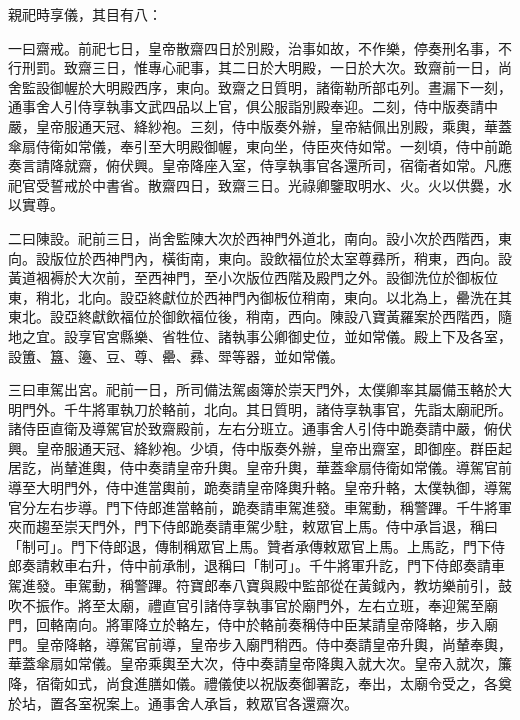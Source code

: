 \begin{pinyinscope}
 親祀時享儀，其目有八：



 一曰齋戒。前祀七日，皇帝散齋四日於別殿，治事如故，不作樂，停奏刑名事，不行刑罰。致齋三日，惟專心祀事，其二日於大明殿，一日於大次。致齋前一日，尚舍監設御幄於大明殿西序，東向。致齋之日質明，諸衛勒所部屯列。晝漏下一刻，通事舍人引侍享執事文武四品以上官，俱公服詣別殿奉迎。二刻，侍中版奏請中嚴，皇帝服通天冠、絳紗袍。三刻，侍中版奏外辦，皇帝結佩出別殿，乘輿，華蓋傘扇侍衛如常儀，奉引至大明殿御幄，東向坐，侍臣夾侍如常。一刻頃，侍中前跪奏言請降就齋，俯伏興。皇帝降座入室，侍享執事官各還所司，宿衛者如常。凡應祀官受誓戒於中書省。散齋四日，致齋三日。光祿卿鑒取明水、火。火以供爨，水以實尊。



 二曰陳設。祀前三日，尚舍監陳大次於西神門外道北，南向。設小次於西階西，東向。設版位於西神門內，橫街南，東向。設飲福位於太室尊彞所，稍東，西向。設黃道裀褥於大次前，至西神門，至小次版位西階及殿門之外。設御洗位於御板位東，稍北，北向。設亞終獻位於西神門內御板位稍南，東向。以北為上，罍洗在其東北。設亞終獻飲福位於御飲福位後，稍南，西向。陳設八寶黃羅案於西階西，隨地之宜。設享官宮縣樂、省牲位、諸執事公卿御史位，並如常儀。殿上下及各室，設簠、簋、籩、豆、尊、罍、彞、斝等器，並如常儀。



 三曰車駕出宮。祀前一日，所司備法駕鹵簿於崇天門外，太僕卿率其屬備玉輅於大明門外。千牛將軍執刀於輅前，北向。其日質明，諸侍享執事官，先詣太廟祀所。諸侍臣直衛及導駕官於致齋殿前，左右分班立。通事舍人引侍中跪奏請中嚴，俯伏興。皇帝服通天冠、絳紗袍。少頃，侍中版奏外辦，皇帝出齋室，即御座。群臣起居訖，尚輦進輿，侍中奏請皇帝升輿。皇帝升輿，華蓋傘扇侍衛如常儀。導駕官前導至大明門外，侍中進當輿前，跪奏請皇帝降輿升輅。皇帝升輅，太僕執御，導駕官分左右步導。門下侍郎進當輅前，跪奏請車駕進發。車駕動，稱警蹕。千牛將軍夾而趨至崇天門外，門下侍郎跪奏請車駕少駐，敕眾官上馬。侍中承旨退，稱曰「制可」。門下侍郎退，傳制稱眾官上馬。贊者承傳敕眾官上馬。上馬訖，門下侍郎奏請敕車右升，侍中前承制，退稱曰「制可」。千牛將軍升訖，門下侍郎奏請車駕進發。車駕動，稱警蹕。符寶郎奉八寶與殿中監部從在黃鉞內，教坊樂前引，鼓吹不振作。將至太廟，禮直官引諸侍享執事官於廟門外，左右立班，奉迎駕至廟門，回輅南向。將軍降立於輅左，侍中於輅前奏稱侍中臣某請皇帝降輅，步入廟門。皇帝降輅，導駕官前導，皇帝步入廟門稍西。侍中奏請皇帝升輿，尚輦奉輿，華蓋傘扇如常儀。皇帝乘輿至大次，侍中奏請皇帝降輿入就大次。皇帝入就次，簾降，宿衛如式，尚食進膳如儀。禮儀使以祝版奏御署訖，奉出，太廟令受之，各奠於坫，置各室祝案上。通事舍人承旨，敕眾官各還齋次。




\end{pinyinscope}
